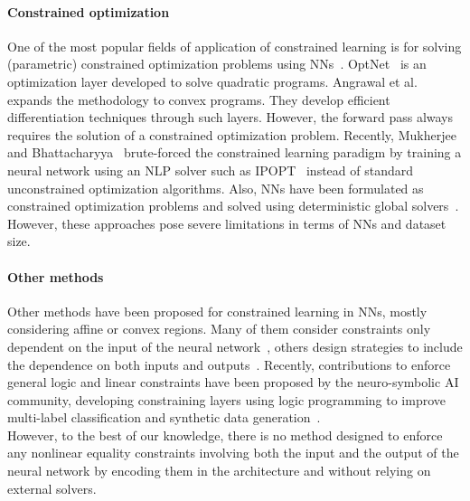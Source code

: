 \paragraph{Constrained optimization}
One of the most popular fields of application of constrained learning is for solving (parametric) constrained optimization problems using NNs~\cite{Kotary2021_EndEndConstrained}. OptNet~\cite{Amos2017_OptNetDifferentiableOptimization} is an optimization layer developed to solve quadratic programs. Angrawal et al.~\cite{Agrawal2019_DifferentiableConvexOptimization} expands the methodology to convex programs. They develop efficient differentiation techniques through such layers. However, the forward pass always requires the solution of a constrained optimization problem. Recently, Mukherjee and Bhattacharyya~\cite{Mukherjee2024_developmentsteadystate} brute-forced the constrained learning paradigm by training a neural network using an NLP solver such as IPOPT~\cite{Waechter2005_implementationinteriorpoint} instead of standard unconstrained optimization algorithms. Also, NNs have been formulated as constrained optimization problems and solved using deterministic global solvers~\cite{Schweidtmann2018_DeterministicGlobalOptimization}. However, these approaches pose severe limitations in terms of NNs and dataset size.


\paragraph{Other methods}
Other methods have been proposed for constrained learning in NNs, mostly considering affine or convex regions. Many of them consider constraints only dependent on the input of the neural network~\cite{Schweidtmann2021_Obeyvaliditylimits, Tordesillas2023_RAYENImpositionHard, Balestriero2022_POLICEProvablyOptimal, Brosowsky2020_SampleSpecificOutput}, others design strategies to include the dependence on both inputs and outputs~\cite{Konstantinov2023_NewComputationallySimple, Lastrucci2025_PicardKKThPINN}. Recently, contributions to enforce general logic and linear constraints have been proposed by the neuro-symbolic AI community, developing constraining layers using logic programming to improve multi-label classification and synthetic data generation~\cite{Giunchiglia2021_MultiLabelClassification, Stoian2024_HowRealisticIs}.\\
However, to the best of our knowledge, there is no method designed to enforce any nonlinear equality constraints involving both the input and the output of the neural network by encoding them in the architecture and without relying on external solvers.